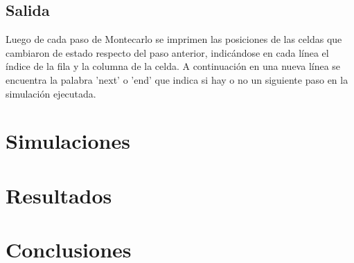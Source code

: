 \documentclass[12pt]{article}
\begin{document}
\subsection{Salida}
Luego de cada paso de Montecarlo se imprimen las posiciones de las celdas que cambiaron de estado respecto del paso anterior, indicándose en cada línea el índice de la fila y la columna de la celda. A continuación en una nueva línea se encuentra la palabra 'next' o 'end' que indica si hay o no un siguiente paso en la simulación ejecutada.

\section{Simulaciones}

\section{Resultados}

\section{Conclusiones}
\end{document}
